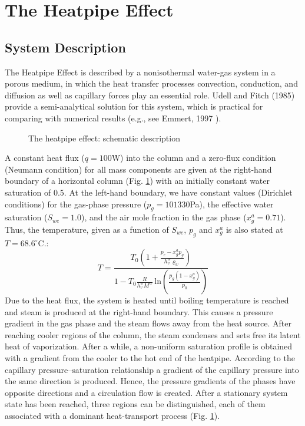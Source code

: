 
\section{The Heatpipe Effect}
\subsection{System Description}


The Heatpipe Effect is described by a nonisothermal water-gas system 
in a porous medium, in which the heat transfer processes
convection, conduction, and diffusion as well as capillary forces play
an essential role. 
Udell and Fitch (1985) \cite{Udell:1985} provide a semi-analytical solution for this system, 
which is practical for comparing with numerical results (e.g., see Emmert, 1997
\cite{emmertpromo}).
\begin{figure}[h]
    \centerline{}
    \caption{The heatpipe effect: schematic description}
    \protect\label{121phasc}
\end{figure}
A constant heat flux ($q = 100$W) into the column and a zero-flux condition 
(Neumann condition) for all mass components are given at the 
right-hand boundary of a horizontal column (Fig. \ref{121phasc})
with an initially constant water saturation of 0.5.
At the left-hand boundary, we have constant values (Dirichlet 
conditions) for the gas-phase pressure ($p_g = 101330$Pa), the 
effective water saturation
($S_{we} = 1.0$), and the air mole fraction in the gas phase
($x_g^a = 0.71$). Thus, the temperature,  
given as a function of $S_{we}$, $p_g$ and $x_g^a$ is also stated at $T = 68.6^\circ$C.:
\begin{equation}
T = \frac{ T_0 \left( 1 + \frac{p_c - x_g^a p_g}{h_v^w \varrho_w}
\right)}{1-T_0\frac{R}{h_v^w M^w} \, \mbox{ln} \left( \frac{p_g
(1 - x_g^a)}{p_0} \right)}
\end{equation}
Due to the heat flux, the system is heated until boiling temperature
is reached and steam is produced at the right-hand boundary. This causes
a pressure gradient in the gas phase and the steam flows away from
the heat source. After reaching cooler regions of the column, the steam
condenses and sets free its latent heat of vaporization. After a while,
a non-uniform saturation profile is obtained with a gradient from the 
cooler to the hot end of the heatpipe. According to the capillary 
pressure--saturation relationship a gradient of the
capillary pressure into the same direction is produced. Hence, the pressure gradients of the
phases have opposite directions and a circulation flow is created.
After a stationary system state has been reached, three regions can be 
distinguished, each of them associated with a dominant heat-transport 
process (Fig. \ref{121phasc}). 

